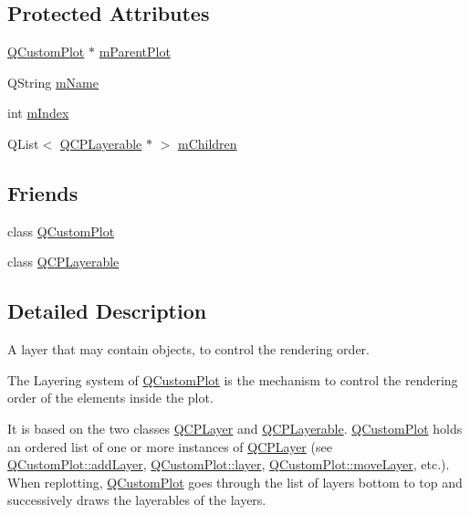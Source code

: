 \subsection*{Protected Attributes}
\begin{DoxyCompactItemize}
\item 
\hyperlink{class_q_custom_plot}{Q\-Custom\-Plot} $\ast$ \hyperlink{class_q_c_p_layer_a2f3374a7884bf403720cd1cf6f7ad1bb}{m\-Parent\-Plot}
\item 
Q\-String \hyperlink{class_q_c_p_layer_a91e6298183cb4b9dfd4efdfaf1ecc220}{m\-Name}
\item 
int \hyperlink{class_q_c_p_layer_a122088bcab6cec76a52b75ce8606605b}{m\-Index}
\item 
Q\-List$<$ \hyperlink{class_q_c_p_layerable}{Q\-C\-P\-Layerable} $\ast$ $>$ \hyperlink{class_q_c_p_layer_a704aa71bba469383c3a3c598c1ec0d28}{m\-Children}
\end{DoxyCompactItemize}
\subsection*{Friends}
\begin{DoxyCompactItemize}
\item 
class \hyperlink{class_q_c_p_layer_a1cdf9df76adcfae45261690aa0ca2198}{Q\-Custom\-Plot}
\item 
class \hyperlink{class_q_c_p_layer_ad655f55cccf49ba14d5172ec517e07ae}{Q\-C\-P\-Layerable}
\end{DoxyCompactItemize}


\subsection{Detailed Description}
A layer that may contain objects, to control the rendering order. 

The Layering system of \hyperlink{class_q_custom_plot}{Q\-Custom\-Plot} is the mechanism to control the rendering order of the elements inside the plot.

It is based on the two classes \hyperlink{class_q_c_p_layer}{Q\-C\-P\-Layer} and \hyperlink{class_q_c_p_layerable}{Q\-C\-P\-Layerable}. \hyperlink{class_q_custom_plot}{Q\-Custom\-Plot} holds an ordered list of one or more instances of \hyperlink{class_q_c_p_layer}{Q\-C\-P\-Layer} (see \hyperlink{class_q_custom_plot_ad5255393df078448bb6ac83fa5db5f52}{Q\-Custom\-Plot\-::add\-Layer}, \hyperlink{class_q_custom_plot_aac492da01782820454e9136a8db28182}{Q\-Custom\-Plot\-::layer}, \hyperlink{class_q_custom_plot_ae896140beff19424e9e9e02d6e331104}{Q\-Custom\-Plot\-::move\-Layer}, etc.). When replotting, \hyperlink{class_q_custom_plot}{Q\-Custom\-Plot} goes through the list of layers bottom to top and successively draws the layerables of the layers.


